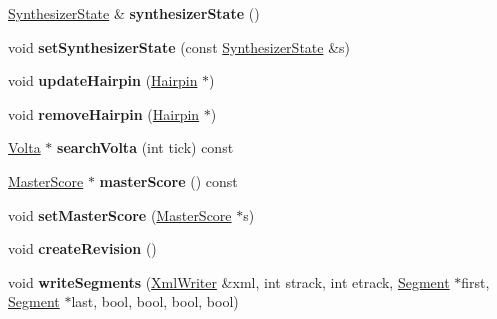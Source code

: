 \begin{DoxyCompactItemize}
\item 
\mbox{\label{class_ms_1_1_score_a1d01889b6f6a2b4c1d0f60ca5dd62cbd}} 
\hyperlink{class_ms_1_1_synthesizer_state}{Synthesizer\+State} \& {\bfseries synthesizer\+State} ()
\item 
\mbox{\label{class_ms_1_1_score_a396591a0c12082444b37f33b0e37524a}} 
void {\bfseries set\+Synthesizer\+State} (const \hyperlink{class_ms_1_1_synthesizer_state}{Synthesizer\+State} \&s)
\item 
\mbox{\label{class_ms_1_1_score_a303f77fe71adf45cca59cfd0214afaa1}} 
void {\bfseries update\+Hairpin} (\hyperlink{class_ms_1_1_hairpin}{Hairpin} $\ast$)
\item 
\mbox{\label{class_ms_1_1_score_a44f9771adde9f16428e0dcb95195a77b}} 
void {\bfseries remove\+Hairpin} (\hyperlink{class_ms_1_1_hairpin}{Hairpin} $\ast$)
\item 
\mbox{\label{class_ms_1_1_score_a3fc69bd8fdef8dee41807ab4363674da}} 
\hyperlink{class_ms_1_1_volta}{Volta} $\ast$ {\bfseries search\+Volta} (int tick) const
\item 
\mbox{\label{class_ms_1_1_score_aac5cfbf34cbd22da196fd31944a260da}} 
\hyperlink{class_ms_1_1_master_score}{Master\+Score} $\ast$ {\bfseries master\+Score} () const
\item 
\mbox{\label{class_ms_1_1_score_a8d80b3fac7f3ce953e8a6a7bba35baad}} 
void {\bfseries set\+Master\+Score} (\hyperlink{class_ms_1_1_master_score}{Master\+Score} $\ast$s)
\item 
\mbox{\label{class_ms_1_1_score_ae429073049b54476891e1ea08ea4f66f}} 
void {\bfseries create\+Revision} ()
\item 
\mbox{\label{class_ms_1_1_score_aa92c03cb7fcc41d65935b519188e382c}} 
void {\bfseries write\+Segments} (\hyperlink{class_ms_1_1_xml_writer}{Xml\+Writer} \&xml, int strack, int etrack, \hyperlink{class_ms_1_1_segment}{Segment} $\ast$first, \hyperlink{class_ms_1_1_segment}{Segment} $\ast$last, bool, bool, bool, bool)
\item 

\end{DoxyCompactItemize}
